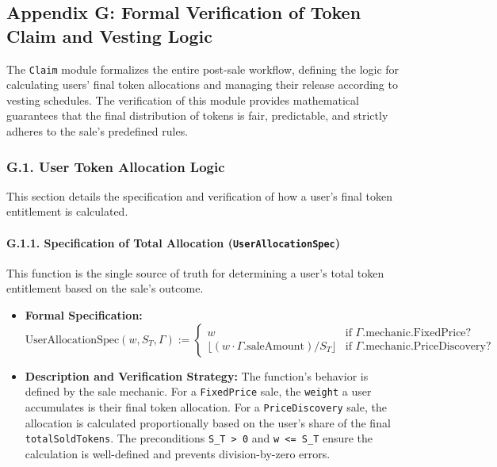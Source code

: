 \documentclass[
  english,
  onecolumn]{article}
\providecommand{\tightlist}{%
  \setlength{\itemsep}{0pt}\setlength{\parskip}{0pt}}
\begin{document}
\subsection{Appendix G: Formal Verification of Token Claim and Vesting
Logic}\label{appendix-g-formal-verification-of-token-claim-and-vesting-logic}

The \texttt{Claim} module formalizes the entire post-sale workflow,
defining the logic for calculating users' final token allocations and
managing their release according to vesting schedules. The verification
of this module provides mathematical guarantees that the final
distribution of tokens is fair, predictable, and strictly adheres to the
sale's predefined rules.

\subsubsection{G.1. User Token Allocation
Logic}\label{g.1.-user-token-allocation-logic}

This section details the specification and verification of how a user's
final token entitlement is calculated.

\paragraph{\texorpdfstring{G.1.1. Specification of Total Allocation
(\texttt{UserAllocationSpec})}{G.1.1. Specification of Total Allocation (UserAllocationSpec)}}\label{g.1.1.-specification-of-total-allocation-userallocationspec}

This function is the single source of truth for determining a user's
total token entitlement based on the sale's outcome.

\begin{itemize}
\tightlist
\item
  \textbf{Formal Specification:} \[
  \text{UserAllocationSpec}(w, S_T, \Gamma) := \begin{cases}
  w & \text{if } \Gamma.\text{mechanic.FixedPrice?} \\
  \lfloor (w \cdot \Gamma.\text{saleAmount}) / S_T \rfloor & \text{if } \Gamma.\text{mechanic.PriceDiscovery?}
  \end{cases}
  \]
\item
  \textbf{Description and Verification Strategy:} The function's
  behavior is defined by the sale mechanic. For a \texttt{FixedPrice}
  sale, the \texttt{weight} a user accumulates is their final token
  allocation. For a \texttt{PriceDiscovery} sale, the allocation is
  calculated proportionally based on the user's share of the final
  \texttt{totalSoldTokens}. The preconditions
  \texttt{S\_T\ \textgreater{}\ 0} and \texttt{w\ \textless{}=\ S\_T}
  ensure the calculation is well-defined and prevents division-by-zero
  errors.
\end{itemize}
\end{document}
